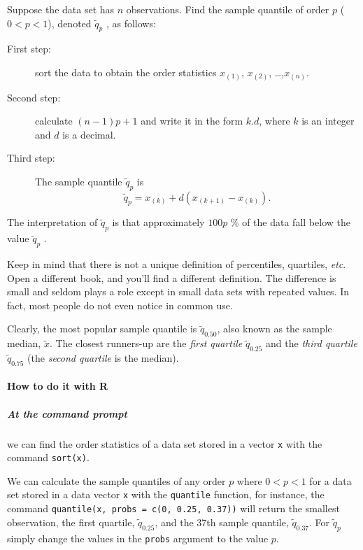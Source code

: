 \documentclass[captions=tableheading]{scrbook}
\begin{document}
Suppose the data set has \(n\) observations. Find the sample quantile of order \(p\) (\(0<p<1\)), denoted \(\tilde{q}_{p}\) , as follows: 

\begin{description}
\item[First step:] sort the data to obtain the order statistics \(x_{(1)}\), \(x_{(2)}\), \ldots{},\(x_{(n)}\).
\item[Second step:] calculate \((n-1)p+1\) and write it in the form \(k.d\), where \(k\) is an integer and \(d\) is a decimal.
\item[Third step:] The sample quantile \(\tilde{q}_{p}\) is
   \begin{equation}
      \tilde{q}_{p}=x_{(k)}+d(x_{(k+1)}-x_{(k)}).
   \end{equation}
\end{description}


The interpretation of \(\tilde{q}_{p}\) is that approximately \(100p\) \% of the data fall below the value \(\tilde{q}_{p}\) . 

Keep in mind that there is not a unique definition of percentiles, quartiles, \emph{etc}. Open a different book, and you'll find a different definition. The difference is small and seldom plays a role except in small data sets with repeated values. In fact, most people do not even notice in common use.

Clearly, the most popular sample quantile is \(\tilde{q}_{0.50}\), also known as the sample median, \(\tilde{x}\). The closest runners-up are the \emph{first quartile} \(\tilde{q}_{0.25}\) and the \emph{third quartile} \(\tilde{q}_{0.75}\) (the \emph{second quartile} is the median). 


\paragraph*{How to do it with \textsf{R}}

\subparagraph*{At the command prompt}
we can find the order statistics of a data set stored in a vector \texttt{x} with the command \texttt{sort(x)}.

We can calculate the sample quantiles of any order \(p\) where \(0<p<1\) for a data set stored in a data vector \texttt{x} with the \texttt{quantile} function, for instance, the command \texttt{quantile(x, probs = c(0, 0.25, 0.37))} will return the smallest observation, the first quartile, \(\tilde{q}_{0.25}\), and the 37th sample quantile, \(\tilde{q}_{0.37}\). For \(\tilde{q}_{p}\) simply change the values in the \texttt{probs} argument to the value \(p\).
\end{document}

